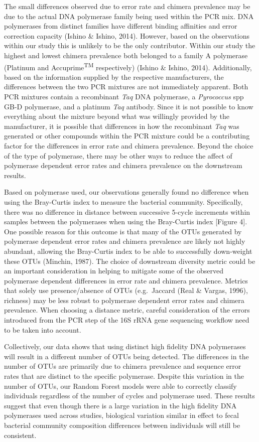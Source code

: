 \documentclass[11pt,]{article}
\begin{document}
The small differences observed due to error rate and chimera prevalence
may be due to the actual DNA polymerase family being used within the PCR
mix. DNA polymerases from distinct families have different binding
affinities and error correction capacity (Ishino \& Ishino, 2014).
However, based on the observations within our study this is unlikely to
be the only contributor. Within our study the highest and lowest chimera
prevalence both belonged to a family A polymerase (Platinum and
Accuprime\textsuperscript{TM} respectively) (Ishino \& Ishino, 2014).
Additionally, based on the information supplied by the respective
manufacturers, the differences between the two PCR mixtures are not
immediately apparent. Both PCR mixtures contain a recombinant \emph{Taq}
DNA polymerase, a \emph{Pyrococcus} spp GB-D polymerase, and a platinum
\emph{Taq} antibody. Since it is not possible to know everything about
the mixture beyond what was willingly provided by the manufacturer, it
is possible that differences in how the recombinant \emph{Taq} was
generated or other compounds within the PCR mixture could be a
contributing factor for the differences in error rate and chimera
prevalence. Beyond the choice of the type of polymerase, there may be
other ways to reduce the affect of polymerase dependent error rates and
chimera prevalence on the downstream results.

Based on polymerase used, our observations generally found no difference
when using the Bray-Curtis index to measure the bacterial community.
Specifically, there was no difference in distance between successive
5-cycle increments within samples between the polymerases when using the
Bray-Curtis index {[}Figure 4{]}. One possible reason for this outcome
is that many of the OTUs generated by polymerase dependent error rates
and chimera prevalence are likely not highly abundant, allowing the
Bray-Curtis index to be able to successfully down-weight these OTUs
(Minchin, 1987). The choice of downstream diversity metric could be an
important consideration in helping to mitigate some of the observed
polymerase dependent differences in error rate and chimera prevalence.
Metrics that solely use presence/absence of OTUs (e.g.~Jaccard (Real \&
Vargas, 1996), richness) may be less robust to polymerase dependent
error rates and chimera prevalence. When choosing a distance metric,
careful consideration of the errors introduced from the PCR step of the
16S rRNA gene sequencing workflow need to be taken into account.

Collectively, our data shows that using distinct high fidelity DNA
polymerases will result in a different number of OTUs being detected.
The differences in the number of OTUs are primarily due to chimera
prevalence and sequence error rates that are distinct to the specific
polymerase. Despite this variation in the number of OTUs, our Random
Forest models were able to correctly classify individuals regardless of
the number of cycles and polymerase used. These results suggest that
even though there is a large variation in the high fidelity DNA
polymerases used across studies, biological variation similar in effect
to fecal bacterial community composition differences between individuals
will still be consistent.
\end{document}
